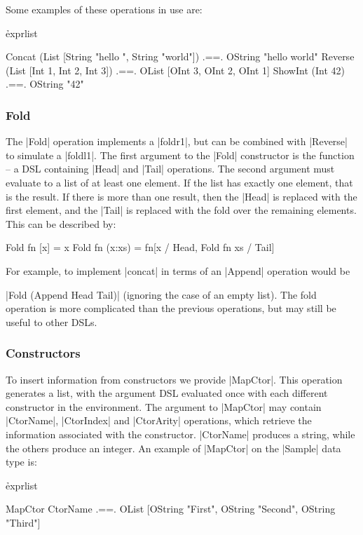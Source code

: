 \documentclass[preprint,draft]{sigplanconf}
\begin{document}
Some examples of these operations in use are:

\h{exprlist}\begin{code}
Concat (List [String "hello ", String "world"])
    .==. OString "hello world"
Reverse (List [Int 1, Int 2, Int 3])
    .==. OList [OInt 3, OInt 2, OInt 1]
ShowInt (Int 42) .==. OString "42"
\end{code}

\subsubsection{Fold}

The |Fold| operation implements a |foldr1|, but can be combined with |Reverse| to simulate a |foldl1|. The first argument to the |Fold| constructor is the function -- a DSL containing |Head| and |Tail| operations. The second argument must evaluate to a list of at least one element. If the list has exactly one element, that is the result. If there is more than one result, then the |Head| is replaced with the first element, and the |Tail| is replaced with the fold over the remaining elements. This can be described by:

\ignore\begin{code}
Fold fn [x] = x
Fold fn (x:xs) = fn[x / Head, Fold fn xs / Tail]
\end{code}

For example, to implement |concat| in terms of an |Append| operation would be \ignore|Fold (Append Head Tail)| (ignoring the case of an empty list). The fold operation is more complicated than the previous operations, but may still be useful to other DSLs.

\subsubsection{Constructors}

To insert information from constructors we provide |MapCtor|. This operation generates a list, with the argument DSL evaluated once with each different constructor in the environment. The argument to |MapCtor| may contain |CtorName|, |CtorIndex| and |CtorArity| operations, which retrieve the information associated with the constructor. |CtorName| produces a string, while the others produce an integer. An example of |MapCtor| on the |Sample| data type is:

\h{exprlist}\begin{code}
MapCtor CtorName .==. OList
    [OString "First", OString "Second", OString "Third"]
\end{code}
\end{document}
